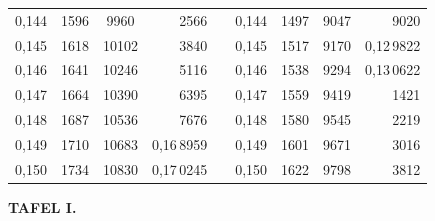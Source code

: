 \begin{tabular}{|c|c|c|r|@{}p{9pt}@{}|c|c|c|r|}
0,144 & 1596 & 9960 & 2566 &  & 0,144 & 1497 & 9047 & 9020 \\
0,145 & 1618 & 10102 & 3840 &  & 0,145 & 1517 & 9170 & 0,12\,9822 \\[3pt]
0,146 & 1641 & 10246 & 5116 &  & 0,146 & 1538 & 9294 & 0,13\,0622 \\
0,147 & 1664 & 10390 & 6395 &  & 0,147 & 1559 & 9419 & 1421 \\
0,148 & 1687 & 10536 & 7676 &  & 0,148 & 1580 & 9545 & 2219 \\
0,149 & 1710 & 10683 & 0,16\,8959 &  & 0,149 & 1601 & 9671 & 3016 \\
0,150 & 1734 & 10830 & 0,17\,0245 &  & 0,150 & 1622 & 9798 & 3812 \\
\hline
\end{tabular}\par
\endgroup
\clearpage
{}
\begingroup
\centering
\fontsize{9}{9}\selectfont
\setlength{\tabcolsep}{6pt}
\renewcommand{\arraystretch}{1}
\setlength{\parskip}{0pt}
\textbf{TAFEL I.}
\par\vspace{7pt}
